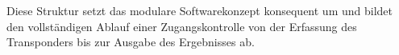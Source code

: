 Diese Struktur setzt das modulare Softwarekonzept konsequent um und bildet den vollständigen Ablauf einer Zugangskontrolle 
von der Erfassung des Transponders bis zur Ausgabe des Ergebnisses ab.




%
%
%


%


